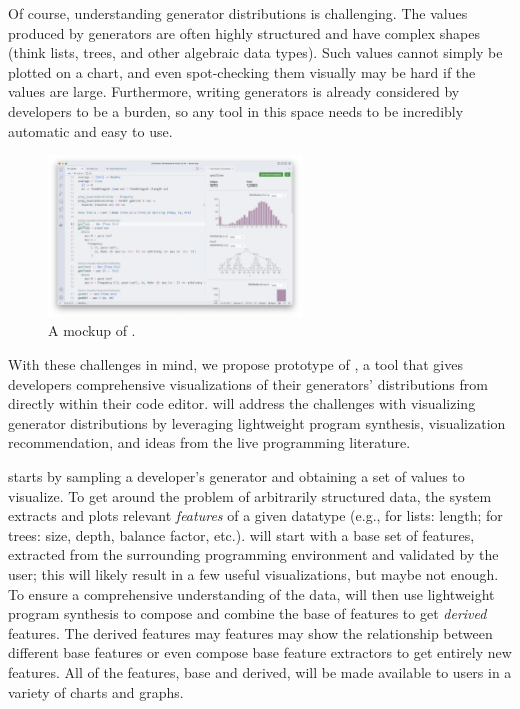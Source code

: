 Of course, understanding generator distributions is challenging.  The values
produced by generators are often highly structured and have complex shapes
(think lists, trees, and other algebraic data types). Such values cannot simply
be plotted on a chart, and even spot-checking them visually may be hard if the
values are large.  Furthermore, writing generators is already considered by
developers to be a burden, so any tool in this space needs to be incredibly
automatic and easy to use.

\begin{figure}
  \centering
  \includegraphics[width=0.6\textwidth]{assets/gen-vis.png}
  \caption{A mockup of \genvis.}\label{fig:gen-vis}
\end{figure}

With these challenges in mind, we propose prototype of \genvis, a tool that
gives developers comprehensive visualizations of their generators' distributions
from directly within their code editor. \genvis{} will address the challenges
with visualizing generator distributions by leveraging lightweight program
synthesis, visualization recommendation, and ideas from the live programming
literature.

\genvis{} starts by sampling a developer's generator and obtaining a set of
values to visualize. To get around the problem of arbitrarily structured data,
the system extracts and plots relevant {\em features} of a given datatype (e.g.,
for lists: length; for trees: size, depth, balance factor, etc.). \genvis{} will
start with a base set of features, extracted from the surrounding programming
environment and validated by the user; this will likely result in a few useful
visualizations, but maybe not enough. To ensure a comprehensive understanding of
the data, \genvis{} will then use lightweight program synthesis to compose and
combine the base of features to get {\em derived} features. The derived features
may features may show the relationship between different base features or even
compose base feature extractors to get entirely new features. All of the
features, base and derived, will be made available to users in a variety of
charts and graphs.

